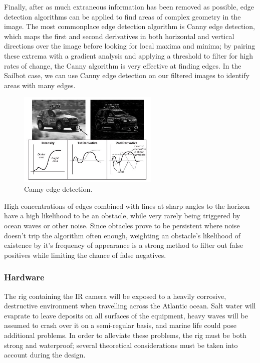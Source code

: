Finally, after as much extraneous information has been removed as possible, edge detection algorithms can be applied to find areas of complex geometry in the image. The most commonplace edge detection algorithm is Canny edge detection, which maps the first and second derivatives in both horizontal and vertical directions over the image before looking for local maxima and minima; by pairing these extrema with a gradient analysis and applying a threshold to filter for high rates of change, the Canny algorithm is very effective at finding edges. In the Sailbot case, we can use Canny edge detection on our filtered images to identify areas with many edges. 
\begin{figure}
\centering
\includegraphics[width=0.6\textwidth]{"./image/canny"}
\caption{Canny edge detection.}
\label{fig:canny}
\end{figure}

High concentrations of edges combined with lines at sharp angles to the horizon have a high likelihood to be an obstacle, while very rarely being triggered by ocean waves or other noise. Since obtacles prove to be persistent where noise doesn't trip the algorithm often enough, weighting an obstacle's likelihood of existence by it's frequency of appearance is a strong method to filter out false positives while limiting the chance of false negatives.


\subsubsection{\label{sec:discussion:theory:righardware}Hardware}

The rig containing the IR camera will be exposed to a heavily corrosive, destructive environment when travelling across the Atlantic ocean. Salt water will evaprate to leave deposits on all surfaces of the equipment, heavy waves will be assumed to crash over it on a semi-regular basis, and marine life could pose additional problems. In order to alleviate these problems, the rig must be both strong and waterproof; several theoretical considerations must be taken into account during the design.

